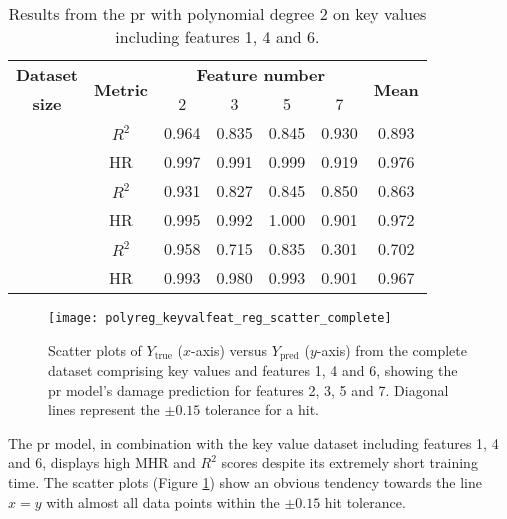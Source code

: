 \begin{table}
    \renewcommand{\arraystretch}{1.4}
    \begin{center}
        \caption{\label{tab:polyreg:kvfs} Results from the \ac{pr} with polynomial degree 2 on key values including features 1, 4 and 6.}
        \begin{tabular}{ >{\bfseries}c c c c c c c }
            \textbf{Dataset} & \multirow{2}{*}{\textbf{Metric}} & \multicolumn{4}{c}{\textbf{Feature number}} & \multirow{2}{*}{\textbf{Mean}} \\
            size &  & 2 & 3 & 5 & 7 \\
            \midrule
            \multirow{2}{*}{Complete}   & \(R^2\) & 0.964 & 0.835 & 0.845 & 0.930 & 0.893 \\
                                        & HR      & 0.997 & 0.991 & 0.999 & 0.919 & 0.976 \\ \cmidrule{2-7}
            \multirow{2}{*}{Reduced}    & \(R^2\) & 0.931 & 0.827 & 0.845 & 0.850 & 0.863\\
                                        & HR      & 0.995 & 0.992 & 1.000 & 0.901 & 0.972 \\ \cmidrule{2-7}
            \multirow{2}{*}{Minimal}    & \(R^2\) & 0.958 & 0.715 & 0.835 & 0.301 & 0.702 \\
                                        & HR      & 0.993 & 0.980 & 0.993 & 0.901 & 0.967 \\
        \end{tabular}
    \end{center}
\end{table}

\begin{figure}[tb!]
    \centering
    \texttt{[image: polyreg\_keyvalfeat\_reg\_scatter\_complete]}
    \caption{\label{fig:polyreg_keyvalfeat_reg_scatter_complete} Scatter plots of \(Y_\text{true}\) (\(x\)-axis) versus \(Y_\text{pred}\) (\(y\)-axis) from the complete dataset comprising key values and features 1, 4 and 6, showing the \ac{pr} model's damage prediction for features 2, 3, 5 and 7. Diagonal lines represent the \(\pm0.15\) tolerance for a hit.}
\end{figure}

The \ac{pr} model, in combination with the key value dataset including features 1, 4 and 6, displays high MHR and \(R^2\) scores despite its extremely short training time. The scatter plots (Figure \ref{fig:polyreg_keyvalfeat_reg_scatter_complete}) show an obvious tendency towards the line \(x = y\) with almost all data points within the \(\pm0.15\) hit tolerance.

